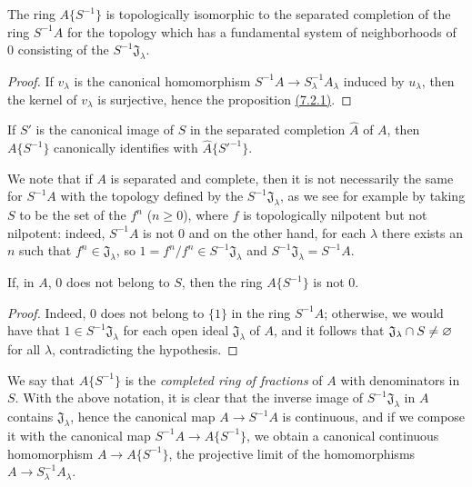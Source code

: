 \begin{prop}[7.6.2]
\label{0.7.6.2}
The ring $A\{S^{-1}\}$ is topologically isomorphic to the separated completion of the ring
$S^{-1}A$ for the topology which has a fundamental system of neighborhoods of $0$ consisting of
the $S^{-1}\mathfrak{J}_\lambda$.
\end{prop}

\begin{proof}
\label{proof-0.7.6.2}
If $v_\lambda$ is the canonical homomorphism $S^{-1}A\to S_\lambda^{-1}A_\lambda$ induced
by $u_\lambda$, then the kernel of $v_\lambda$ is surjective, hence the proposition
\hyperref[0.7.2.1]{(7.2.1)}.
\end{proof}

\begin{cor}[7.6.3]
\label{0.7.6.3}
If $S'$ is the canonical image of $S$ in the separated completion $\widehat{A}$ of $A$, then
$A\{S^{-1}\}$ canonically identifies with $\widehat{A}\{{S'}^{-1}\}$.
\end{cor}

We note that if $A$ is separated and complete, then it is not necessarily the same for
$S^{-1}A$ with the topology defined by the $S^{-1}\mathfrak{J}_\lambda$, as we see for example
by taking $S$ to be the set of the $f^n$ ($n\geqslant 0$), where $f$ is topologically nilpotent
but not nilpotent: indeed, $S^{-1}A$ is not $0$ and on the other hand, for each $\lambda$ there
exists an $n$ such that $f^n\in\mathfrak{J}_\lambda$, so $1=f^n/f^n\in S^{-1}\mathfrak{J}_\lambda$
and $S^{-1}\mathfrak{J}_\lambda=S^{-1}A$.

\begin{cor}[7.6.4]
\label{0.7.6.4}
If, in $A$, $0$ does not belong to $S$, then the ring $A\{S^{-1}\}$ is not $0$.
\end{cor}

\begin{proof}
\label{proof-0.7.6.4}
Indeed, $0$ does not belong to $\{1\}$ in the ring $S^{-1}A$; otherwise, we would have that
$1\in S^{-1}\mathfrak{J}_\lambda$ for each open ideal $\mathfrak{J}_\lambda$ of $A$, and it
follows that $\mathfrak{J}_\lambda\cap S\neq\varnothing$ for all $\lambda$, contradicting the
hypothesis.
\end{proof}

\begin{env}[7.6.5]
\label{0.7.6.5}
We say that $A\{S^{-1}\}$ is the {\em completed ring of fractions} of $A$ with denominators
in $S$. With the above notation, it is clear that the inverse image of $S^{-1}\mathfrak{J}_\lambda$
in $A$ contains $\mathfrak{J}_\lambda$, hence the canonical map $A\to S^{-1}A$ is continuous, and if
we compose it with the canonical map $S^{-1}A\to A\{S^{-1}\}$, we obtain a canonical continuous
homomorphism $A\to A\{S^{-1}\}$, the projective limit of the homomorphisms
$A\to S_\lambda^{-1}A_\lambda$.
\end{env}

